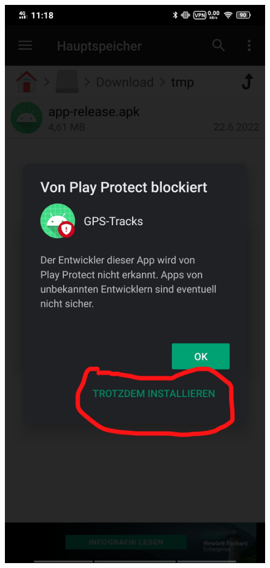 \documentclass{article}
\begin{document}
\begin{enumerate}
\begin{minipage}{0.5\textwidth}
        \end{minipage}
        \begin{minipage}{0.5\textwidth}
        \begin{figure}[H]
            \includegraphics[scale=0.13]{19.jpg}
            \centering
        \end{figure}
        \end{minipage}
        

\end{enumerate}
\end{document}
